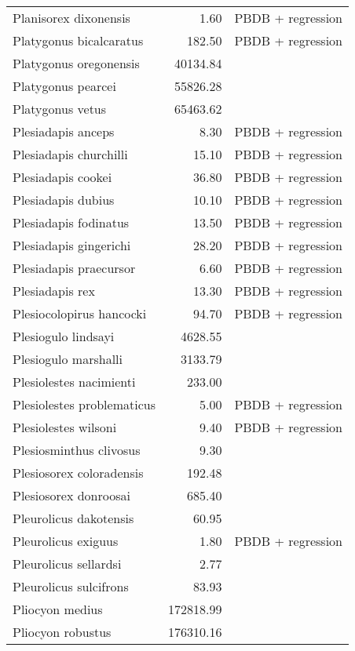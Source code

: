 \begin{table}[ht]
\begin{tabular}{lrl}
  Planisorex dixonensis & 1.60 & PBDB + regression \\ 
  Platygonus bicalcaratus & 182.50 & PBDB + regression \\ 
  Platygonus oregonensis & 40134.84 & \cite{Tomiya2013} \\ 
  Platygonus pearcei & 55826.28 & \cite{Tomiya2013} \\ 
  Platygonus vetus & 65463.62 & \cite{Brook2004a} \\ 
  Plesiadapis anceps & 8.30 & PBDB + regression \\ 
  Plesiadapis churchilli & 15.10 & PBDB + regression \\ 
  Plesiadapis cookei & 36.80 & PBDB + regression \\ 
  Plesiadapis dubius & 10.10 & PBDB + regression \\ 
  Plesiadapis fodinatus & 13.50 & PBDB + regression \\ 
  Plesiadapis gingerichi & 28.20 & PBDB + regression \\ 
  Plesiadapis praecursor & 6.60 & PBDB + regression \\ 
  Plesiadapis rex & 13.30 & PBDB + regression \\ 
  Plesiocolopirus hancocki & 94.70 & PBDB + regression \\ 
  Plesiogulo lindsayi & 4628.55 & \cite{Tomiya2013} \\ 
  Plesiogulo marshalli & 3133.79 & \cite{Tomiya2013} \\ 
  Plesiolestes nacimienti & 233.00 & \cite{Soligo2006} \\ 
  Plesiolestes problematicus & 5.00 & PBDB + regression \\ 
  Plesiolestes wilsoni & 9.40 & PBDB + regression \\ 
  Plesiosminthus clivosus & 9.30 & \cite{Tomiya2013} \\ 
  Plesiosorex coloradensis & 192.48 & \cite{Tomiya2013} \\ 
  Plesiosorex donroosai & 685.40 & \cite{Tomiya2013} \\ 
  Pleurolicus dakotensis & 60.95 & \cite{Tomiya2013} \\ 
  Pleurolicus exiguus & 1.80 & PBDB + regression \\ 
  Pleurolicus sellardsi & 2.77 & \cite{Zakrzewski1991a} \\ 
  Pleurolicus sulcifrons & 83.93 & \cite{Tomiya2013} \\ 
  Pliocyon medius & 172818.99 & \cite{Tomiya2013} \\ 
  Pliocyon robustus & 176310.16 & \cite{Tomiya2013} \\ 

\end{tabular}
\end{table}

